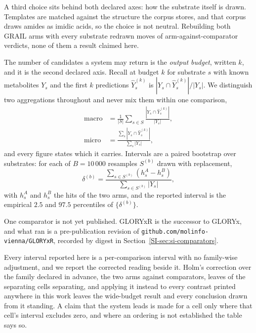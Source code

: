 A third choice sits behind both declared axes: how the substrate itself is drawn. Templates are
matched against the structure the corpus stores, and that corpus draws amides as imidic acids, so
the choice is not neutral. Rebuilding both GRAIL arms with every substrate redrawn moves
\numDsweepMoved{} of \numDsweepCells{} arm-against-comparator verdicts, none of them a result
claimed here.

The number of candidates a system may return is the \emph{output budget}, written $k$, and it is
the second declared axis. Recall at budget $k$ for substrate $s$ with known metabolites $Y_s$ and
the first $k$ predictions $\hat{Y}^{(k)}_s$ is $|Y_s \cap \hat{Y}^{(k)}_s| / |Y_s|$. We distinguish
two aggregations throughout and never mix them within one comparison,
\begin{align}
\mathrm{macro} &= \frac{1}{|S|}\sum_{s \in S}
\frac{|Y_s \cap \hat{Y}^{(k)}_s|}{|Y_s|}, \\
\mathrm{micro} &= \frac{\sum_{s} |Y_s \cap \hat{Y}^{(k)}_s|}{\sum_{s} |Y_s|},
\end{align}
and every figure states which it carries. Intervals are a paired bootstrap over substrates: for
each of $B = 10\,000$ resamples $S^{(b)}$ drawn with replacement,
\begin{equation}
\delta^{(b)} = \frac{\sum_{s \in S^{(b)}} \left( h^A_s - h^B_s \right)}
{\sum_{s \in S^{(b)}} |Y_s|},
\label{eq:bootstrap}
\end{equation}
with $h^A_s$ and $h^B_s$ the hits of the two arms, and the reported interval is the empirical
$2.5$ and $97.5$ percentiles of $\{\delta^{(b)}\}$.

One comparator is not yet published. GLORYxR is the successor to GLORYx, and what ran is a
pre-publication revision of \texttt{github.com/molinfo-vienna/GLORYxR}, recorded by digest in
Section~\ref{SI-sec:si-comparators}.

Every interval reported here is a per-comparison interval with no family-wise adjustment, and we
report the corrected reading beside it. Holm's correction over the family declared in advance, the
two arms against \numSweepFamilycomparatorsWord{} comparators, leaves \numHolmSurviving{} of the
\numHolmSeparating{} separating cells separating, and applying it instead to every contrast printed
anywhere in this work leaves the wide-budget result and every conclusion drawn from it standing.
A claim that the system leads is made for a cell only where that cell's interval excludes zero, and where an ordering is not established the table says so.

